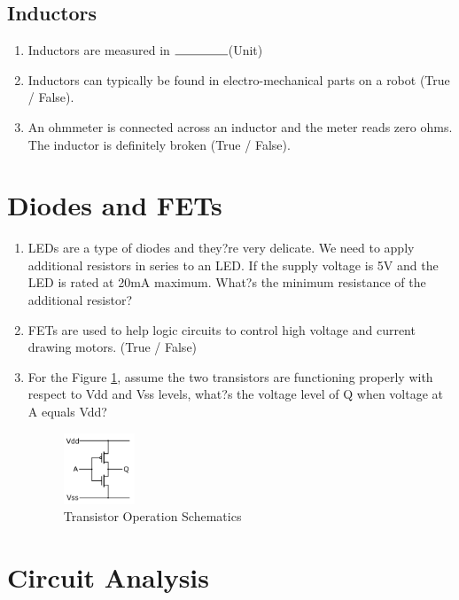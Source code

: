 \documentclass{article}
\newcommand{\ans}{$\rule{1.5cm}{0.15mm}$}
\begin{document}
\subsection{Inductors}
\begin{enumerate}
	\item Inductors are measured in \ans (Unit)
	\item Inductors can typically be found in electro-mechanical parts on a robot (True / False).
	\item An ohmmeter is connected across an inductor and the meter reads zero ohms. The inductor is definitely broken (True / False).
\end{enumerate}

\section{Diodes and FETs}
\begin{enumerate}
	\item LEDs are a type of diodes and they?re very delicate. We need to apply additional resistors in series to an LED. If the supply voltage is 5V and the LED is rated at 20mA maximum. What?s the minimum resistance of the additional resistor?
	\item FETs are used to help logic circuits to control high voltage and current drawing motors. (True / False)
	\item For the Figure \ref{fig:transistor}, assume the two transistors are functioning properly with respect to Vdd and Vss levels, what?s the voltage level of Q when voltage at A equals Vdd?
	\begin{figure}
		\center
		\includegraphics[width=0.2\textwidth, keepaspectratio]{fetoperation}
		\caption{Transistor Operation Schematics}
		\label{fig:transistor}
	\end{figure}
\end{enumerate}

\section{Circuit Analysis}
\end{document}
